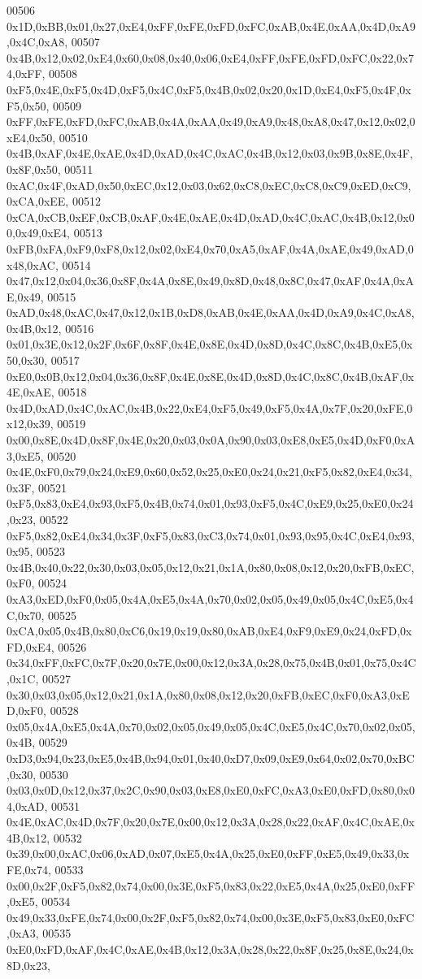 \begin{DoxyCode}
00506 0x1D,0xBB,0x01,0x27,0xE4,0xFF,0xFE,0xFD,0xFC,0xAB,0x4E,0xAA,0x4D,0xA9,0x4C,0xA8,
00507 0x4B,0x12,0x02,0xE4,0x60,0x08,0x40,0x06,0xE4,0xFF,0xFE,0xFD,0xFC,0x22,0x74,0xFF,
00508 0xF5,0x4E,0xF5,0x4D,0xF5,0x4C,0xF5,0x4B,0x02,0x20,0x1D,0xE4,0xF5,0x4F,0xF5,0x50,
00509 0xFF,0xFE,0xFD,0xFC,0xAB,0x4A,0xAA,0x49,0xA9,0x48,0xA8,0x47,0x12,0x02,0xE4,0x50,
00510 0x4B,0xAF,0x4E,0xAE,0x4D,0xAD,0x4C,0xAC,0x4B,0x12,0x03,0x9B,0x8E,0x4F,0x8F,0x50,
00511 0xAC,0x4F,0xAD,0x50,0xEC,0x12,0x03,0x62,0xC8,0xEC,0xC8,0xC9,0xED,0xC9,0xCA,0xEE,
00512 0xCA,0xCB,0xEF,0xCB,0xAF,0x4E,0xAE,0x4D,0xAD,0x4C,0xAC,0x4B,0x12,0x00,0x49,0xE4,
00513 0xFB,0xFA,0xF9,0xF8,0x12,0x02,0xE4,0x70,0xA5,0xAF,0x4A,0xAE,0x49,0xAD,0x48,0xAC,
00514 0x47,0x12,0x04,0x36,0x8F,0x4A,0x8E,0x49,0x8D,0x48,0x8C,0x47,0xAF,0x4A,0xAE,0x49,
00515 0xAD,0x48,0xAC,0x47,0x12,0x1B,0xD8,0xAB,0x4E,0xAA,0x4D,0xA9,0x4C,0xA8,0x4B,0x12,
00516 0x01,0x3E,0x12,0x2F,0x6F,0x8F,0x4E,0x8E,0x4D,0x8D,0x4C,0x8C,0x4B,0xE5,0x50,0x30,
00517 0xE0,0x0B,0x12,0x04,0x36,0x8F,0x4E,0x8E,0x4D,0x8D,0x4C,0x8C,0x4B,0xAF,0x4E,0xAE,
00518 0x4D,0xAD,0x4C,0xAC,0x4B,0x22,0xE4,0xF5,0x49,0xF5,0x4A,0x7F,0x20,0xFE,0x12,0x39,
00519 0x00,0x8E,0x4D,0x8F,0x4E,0x20,0x03,0x0A,0x90,0x03,0xE8,0xE5,0x4D,0xF0,0xA3,0xE5,
00520 0x4E,0xF0,0x79,0x24,0xE9,0x60,0x52,0x25,0xE0,0x24,0x21,0xF5,0x82,0xE4,0x34,0x3F,
00521 0xF5,0x83,0xE4,0x93,0xF5,0x4B,0x74,0x01,0x93,0xF5,0x4C,0xE9,0x25,0xE0,0x24,0x23,
00522 0xF5,0x82,0xE4,0x34,0x3F,0xF5,0x83,0xC3,0x74,0x01,0x93,0x95,0x4C,0xE4,0x93,0x95,
00523 0x4B,0x40,0x22,0x30,0x03,0x05,0x12,0x21,0x1A,0x80,0x08,0x12,0x20,0xFB,0xEC,0xF0,
00524 0xA3,0xED,0xF0,0x05,0x4A,0xE5,0x4A,0x70,0x02,0x05,0x49,0x05,0x4C,0xE5,0x4C,0x70,
00525 0xCA,0x05,0x4B,0x80,0xC6,0x19,0x19,0x80,0xAB,0xE4,0xF9,0xE9,0x24,0xFD,0xFD,0xE4,
00526 0x34,0xFF,0xFC,0x7F,0x20,0x7E,0x00,0x12,0x3A,0x28,0x75,0x4B,0x01,0x75,0x4C,0x1C,
00527 0x30,0x03,0x05,0x12,0x21,0x1A,0x80,0x08,0x12,0x20,0xFB,0xEC,0xF0,0xA3,0xED,0xF0,
00528 0x05,0x4A,0xE5,0x4A,0x70,0x02,0x05,0x49,0x05,0x4C,0xE5,0x4C,0x70,0x02,0x05,0x4B,
00529 0xD3,0x94,0x23,0xE5,0x4B,0x94,0x01,0x40,0xD7,0x09,0xE9,0x64,0x02,0x70,0xBC,0x30,
00530 0x03,0x0D,0x12,0x37,0x2C,0x90,0x03,0xE8,0xE0,0xFC,0xA3,0xE0,0xFD,0x80,0x04,0xAD,
00531 0x4E,0xAC,0x4D,0x7F,0x20,0x7E,0x00,0x12,0x3A,0x28,0x22,0xAF,0x4C,0xAE,0x4B,0x12,
00532 0x39,0x00,0xAC,0x06,0xAD,0x07,0xE5,0x4A,0x25,0xE0,0xFF,0xE5,0x49,0x33,0xFE,0x74,
00533 0x00,0x2F,0xF5,0x82,0x74,0x00,0x3E,0xF5,0x83,0x22,0xE5,0x4A,0x25,0xE0,0xFF,0xE5,
00534 0x49,0x33,0xFE,0x74,0x00,0x2F,0xF5,0x82,0x74,0x00,0x3E,0xF5,0x83,0xE0,0xFC,0xA3,
00535 0xE0,0xFD,0xAF,0x4C,0xAE,0x4B,0x12,0x3A,0x28,0x22,0x8F,0x25,0x8E,0x24,0x8D,0x23,

\end{DoxyCode}
